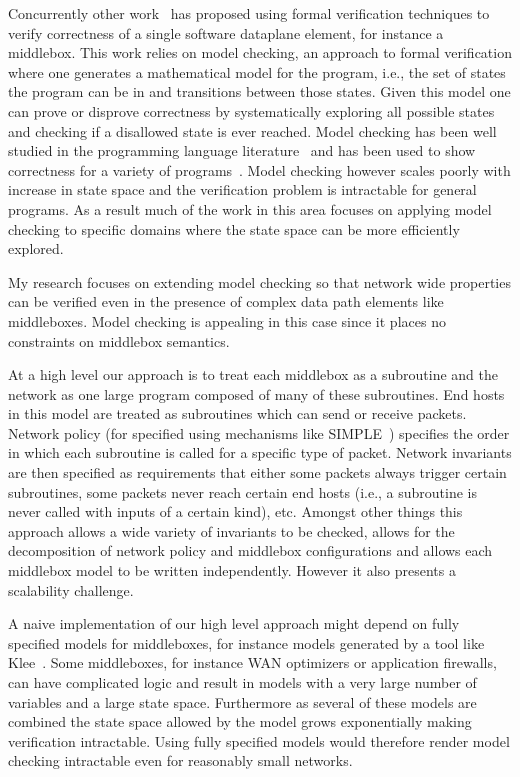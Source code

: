 \documentclass[letterpaper]{article}
\begin{document}
Concurrently other work~\cite{dobrescu2014software} has proposed using formal verification techniques to
verify correctness of a single software dataplane element, for instance a middlebox. This work relies on model
checking, an approach to formal verification where one generates a mathematical model for the program, i.e.,
the set of states the program can be in and transitions between those states. Given this model one can prove
or disprove correctness by systematically exploring all possible states and checking if a disallowed state is
ever reached. Model checking has been well studied in the programming language
literature~\cite{jhala2009software, han2007providing} and has been used to show correctness for a variety of
programs~\cite{cadar2008klee, klein2009sel4}.  Model checking however scales poorly with increase in state
space and the verification problem is intractable for general programs. As a result much of the work in this
area focuses on applying model checking to specific domains where the state space can be more efficiently
explored. 

My research focuses on extending model checking so that network wide properties can be verified even in the
presence of complex data path elements like middleboxes. Model checking is appealing in this case since it
places no constraints on middlebox semantics. 

At a high level our approach is to treat each middlebox as a subroutine and the network as one large program
composed of many of these subroutines. End hosts in this model are treated as subroutines which can send or
receive packets.  Network policy (for specified using mechanisms like SIMPLE~\cite{qazi2013simple}) specifies
the order in which each subroutine is called for a specific type of packet. Network invariants are then
specified as requirements that either some packets always trigger certain subroutines, some packets never
reach certain end hosts (i.e., a subroutine is never called with inputs of a certain kind), etc. Amongst other
things this approach allows a wide variety of invariants to be checked, allows for the decomposition of
network policy and middlebox configurations and allows each middlebox model to be written independently.
However it also presents a scalability challenge.

A naive implementation of our high level approach might depend on fully specified models for middleboxes, for
instance models generated by a tool like Klee~\cite{cadar2008klee}. Some middleboxes, for instance WAN
optimizers or application firewalls, can have complicated logic and result in models with a very large number
of variables and a large state space. Furthermore as several of these models are combined the state space
allowed by the model grows exponentially making verification intractable. Using fully specified models would
therefore render model checking intractable even for reasonably small networks.
\end{document}
